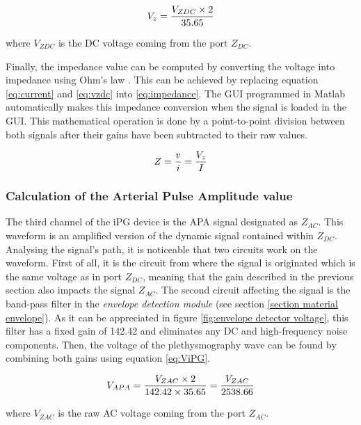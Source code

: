 \begin{align}
	\label{eq:vzdc}
	V_z = \frac{V_{ZDC} \times 2}{35.65} \tagaddtext{[\si{\volt}]}
\end{align}

where $V_{ZDC}$ is the DC voltage coming from the port $Z_{DC}$.

Finally, the impedance value can be computed by converting the voltage into impedance using Ohm's law \cite{ohm1827galvanische}. This can be achieved by replacing equation \ref{eq:current} and \ref{eq:vzdc} into \ref{eq:impedance}. The GUI programmed in Matlab automatically makes this impedance conversion when the signal is loaded in the GUI. This mathematical operation is done by a point-to-point division between both signals after their gains have been subtracted to their raw values. 

\begin{align}
	\label{eq:impedance}
	Z = \frac{v}{i}=\frac{V_z}{I} \tagaddtext{[\si{\ohm}]}
\end{align}

\subsubsection{Calculation of the Arterial Pulse Amplitude value}
The third channel of the iPG device is the APA signal designated as $Z_{AC}$. This waveform is an amplified version of the dynamic signal contained within $Z_{DC}$. Analysing the signal's path, it is noticeable that two circuits work on the waveform. First of all, it is the circuit from where the signal is originated which is the same voltage as in port $Z_{DC}$, meaning that the gain described in the previous section also impacts the signal $Z_{AC}$. The second circuit affecting the signal is the band-pass filter in the \textit{envelope detection module} (see section \ref{section material envelope}). As it can be appreciated in figure \ref{fig:envelope detector voltage}, this filter has a fixed gain of \num{142.42} and eliminates any DC and high-frequency noise components. Then, the voltage of the plethysmography wave can be found by combining both gains using equation \ref{eq:ViPG}.

\begin{align}
	\label{eq:ViPG}
	V_{APA} = \frac{V_{ZAC} \times 2}{142.42 \times 35.65}=\frac{V_{ZAC}}{2538.66} \tagaddtext{[\si{\volt}]}
\end{align}

where $V_{ZAC}$ is the raw AC voltage coming from the port $Z_{AC}$.

